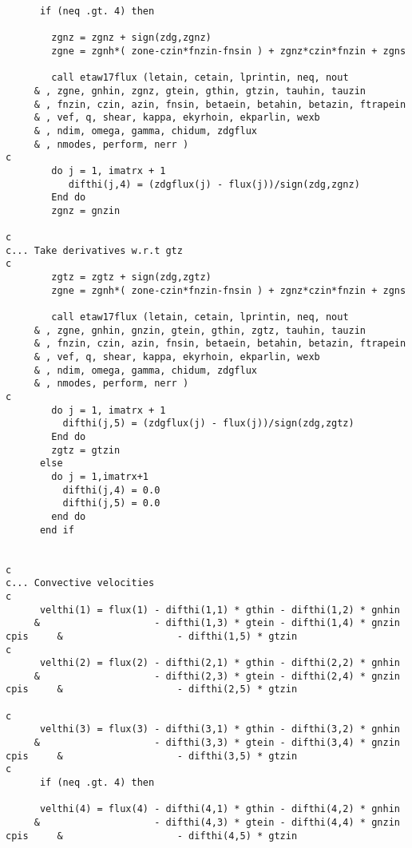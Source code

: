 \begin{verbatim}
      if (neq .gt. 4) then

        zgnz = zgnz + sign(zdg,zgnz)
        zgne = zgnh*( zone-czin*fnzin-fnsin ) + zgnz*czin*fnzin + zgns

        call etaw17flux (letain, cetain, lprintin, neq, nout
     & , zgne, gnhin, zgnz, gtein, gthin, gtzin, tauhin, tauzin
     & , fnzin, czin, azin, fnsin, betaein, betahin, betazin, ftrapein
     & , vef, q, shear, kappa, ekyrhoin, ekparlin, wexb
     & , ndim, omega, gamma, chidum, zdgflux
     & , nmodes, perform, nerr )
c
        do j = 1, imatrx + 1
           difthi(j,4) = (zdgflux(j) - flux(j))/sign(zdg,zgnz)
        End do
        zgnz = gnzin

c
c... Take derivatives w.r.t gtz
c
        zgtz = zgtz + sign(zdg,zgtz)
        zgne = zgnh*( zone-czin*fnzin-fnsin ) + zgnz*czin*fnzin + zgns

        call etaw17flux (letain, cetain, lprintin, neq, nout
     & , zgne, gnhin, gnzin, gtein, gthin, zgtz, tauhin, tauzin
     & , fnzin, czin, azin, fnsin, betaein, betahin, betazin, ftrapein
     & , vef, q, shear, kappa, ekyrhoin, ekparlin, wexb
     & , ndim, omega, gamma, chidum, zdgflux
     & , nmodes, perform, nerr )
c
        do j = 1, imatrx + 1
          difthi(j,5) = (zdgflux(j) - flux(j))/sign(zdg,zgtz)
        End do
        zgtz = gtzin
      else 
        do j = 1,imatrx+1
          difthi(j,4) = 0.0
          difthi(j,5) = 0.0
        end do
      end if
           

c
c... Convective velocities
c
      velthi(1) = flux(1) - difthi(1,1) * gthin - difthi(1,2) * gnhin
     &                    - difthi(1,3) * gtein - difthi(1,4) * gnzin
cpis     &                    - difthi(1,5) * gtzin 
c
      velthi(2) = flux(2) - difthi(2,1) * gthin - difthi(2,2) * gnhin
     &                    - difthi(2,3) * gtein - difthi(2,4) * gnzin
cpis     &                    - difthi(2,5) * gtzin 

c
      velthi(3) = flux(3) - difthi(3,1) * gthin - difthi(3,2) * gnhin
     &                    - difthi(3,3) * gtein - difthi(3,4) * gnzin
cpis     &                    - difthi(3,5) * gtzin
c
      if (neq .gt. 4) then 

      velthi(4) = flux(4) - difthi(4,1) * gthin - difthi(4,2) * gnhin
     &                    - difthi(4,3) * gtein - difthi(4,4) * gnzin
cpis     &                    - difthi(4,5) * gtzin



\end{verbatim}
